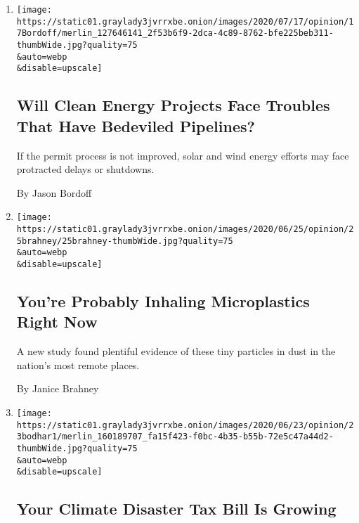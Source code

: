 \begin{enumerate}
\def\labelenumi{\arabic{enumi}.}
\item
  \href{/2020/07/20/opinion/pipelines-clean-energy.html}{}

  \texttt{[image: https://static01.graylady3jvrrxbe.onion/images/2020/07/17/opinion/17Bordoff/merlin\_127646141\_2f53b6f9-2dca-4c89-8762-bfe225beb311-thumbWide.jpg?quality=75\\\&auto=webp\\\&disable=upscale]}

  \hypertarget{will-clean-energy-projects-face-troubles-that-have-bedeviled-pipelines}{%
  \subsection{Will Clean Energy Projects Face Troubles That Have
  Bedeviled
  Pipelines?}\label{will-clean-energy-projects-face-troubles-that-have-bedeviled-pipelines}}

  If the permit process is not improved, solar and wind energy efforts
  may face protracted delays or shutdowns.

  By Jason Bordoff
\item
  \href{/2020/06/25/opinion/plastic-air-pollution.html}{}

  \texttt{[image: https://static01.graylady3jvrrxbe.onion/images/2020/06/25/opinion/25brahney/25brahney-thumbWide.jpg?quality=75\\\&auto=webp\\\&disable=upscale]}

  \hypertarget{youre-probably-inhaling-microplastics-right-now}{%
  \subsection{You're Probably Inhaling Microplastics Right
  Now}\label{youre-probably-inhaling-microplastics-right-now}}

  A new study found plentiful evidence of these tiny particles in dust
  in the nation's most remote places.

  By Janice Brahney
\item
  \href{/2020/06/23/opinion/climate-change-financial-disaster.html}{}

  \texttt{[image: https://static01.graylady3jvrrxbe.onion/images/2020/06/23/opinion/23bodhar1/merlin\_160189707\_fa15f423-f0bc-4b35-b55b-72e5c47a44d2-thumbWide.jpg?quality=75\\\&auto=webp\\\&disable=upscale]}

  \hypertarget{your-climate-disaster-tax-bill-is-growing}{%
  \subsection{Your Climate Disaster Tax Bill Is
  Growing}\label{your-climate-disaster-tax-bill-is-growing}}


\end{enumerate}
